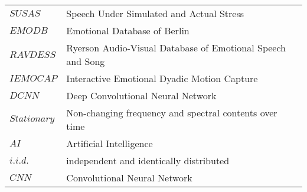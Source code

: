 \begin{longtable}{ll}
    $SUSAS$ & {Speech Under Simulated and Actual Stress} \\
    $EMODB$ & {Emotional Database of Berlin} \\
    $RAVDESS$ & {Ryerson Audio-Visual Database of Emotional Speech and Song} \\
    $IEMOCAP$ & {Interactive Emotional Dyadic Motion Capture} \\
    $DCNN$ & {Deep Convolutional Neural Network} \\
    $Stationary$ & Non-changing frequency and spectral contents over time \\
    $AI$ & {Artificial Intelligence} \\
    $i.i.d.$ & {independent and identically distributed} \\
    $CNN$ & {Convolutional Neural Network} \\
    
    
    
	\end{longtable}

